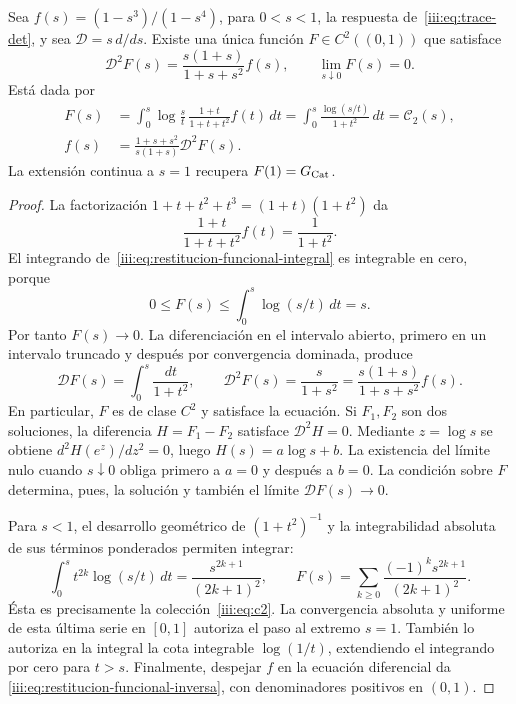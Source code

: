 \begin{theorem}
\label{iii:thm:restitucion-funcional-catalan}
Sea $f(s)=(1-s^3)/(1-s^4)$, para $0<s<1$, la respuesta
de~\eqref{iii:eq:trace-det}, y sea $\mathcal D=s\,d/ds$.
Existe una única función $F\in C^2((0,1))$ que satisface
\begin{equation}
 \mathcal D^2F(s)=\frac{s(1+s)}{1+s+s^2}f(s),
 \qquad \lim_{s\downarrow0}F(s)=0.
 \label{iii:eq:restitucion-funcional-problema}
\end{equation}
Está dada por
\begin{align}
 F(s)&=\int_0^s\log\frac{s}{t}\,
          \frac{1+t}{1+t+t^2}f(t)\,dt
       =\int_0^s\frac{\log(s/t)}{1+t^2}\,dt
       =\mathcal C_2(s),
 \label{iii:eq:restitucion-funcional-integral}\\
 f(s)&=\frac{1+s+s^2}{s(1+s)}\mathcal D^2F(s).
 \label{iii:eq:restitucion-funcional-inversa}
\end{align}
La extensión continua a $s=1$ recupera $F(1)=G_{\rm Cat}$.
\end{theorem}
\begin{proof}
La factorización $1+t+t^2+t^3=(1+t)(1+t^2)$ da
\[
 \frac{1+t}{1+t+t^2}f(t)=\frac1{1+t^2}.
\]
El integrando de~\eqref{iii:eq:restitucion-funcional-integral} es
integrable en cero, porque
\[
 0\leq F(s)\leq\int_0^s\log(s/t)\,dt=s.
\]
Por tanto $F(s)\to0$. La diferenciación en el intervalo abierto,
primero en un intervalo truncado y después por convergencia dominada,
produce
\[
 \mathcal DF(s)=\int_0^s\frac{dt}{1+t^2},
 \qquad \mathcal D^2F(s)=\frac{s}{1+s^2}
     =\frac{s(1+s)}{1+s+s^2}f(s).
\]
En particular, $F$ es de clase $C^2$ y satisface la ecuación.
Si $F_1,F_2$ son dos soluciones, la diferencia $H=F_1-F_2$
satisface $\mathcal D^2H=0$. Mediante $z=\log s$ se obtiene
$d^2H(e^z)/dz^2=0$, luego $H(s)=a\log s+b$.
La existencia del límite nulo cuando $s\downarrow0$ obliga primero
a $a=0$ y después a $b=0$. La condición sobre $F$ determina, pues,
la solución y también el límite $\mathcal DF(s)\to0$.

Para $s<1$, el desarrollo geométrico de $(1+t^2)^{-1}$ y la
integrabilidad absoluta de sus términos ponderados permiten integrar:
\[
 \int_0^s t^{2k}\log(s/t)\,dt
     =\frac{s^{2k+1}}{(2k+1)^2},\qquad
 F(s)=\sum_{k\geq0}\frac{(-1)^ks^{2k+1}}{(2k+1)^2}.
\]
Ésta es precisamente la colección~\eqref{iii:eq:c2}. La convergencia
absoluta y uniforme de esta última serie en $[0,1]$ autoriza el
paso al extremo $s=1$. También lo autoriza en la integral la cota
integrable $\log(1/t)$, extendiendo el integrando por cero para
$t>s$. Finalmente, despejar $f$ en la ecuación diferencial da
\eqref{iii:eq:restitucion-funcional-inversa}, con denominadores
positivos en $(0,1)$.
\end{proof}

